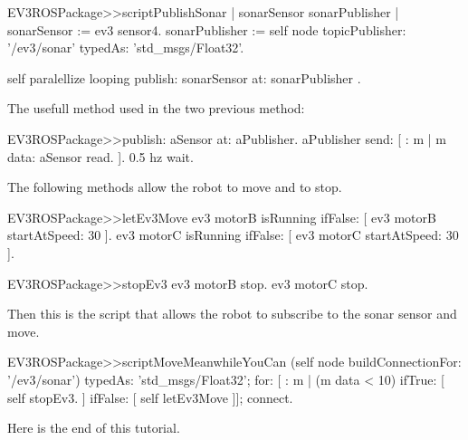 \documentclass[a4paper,10pt,twoside]{book}
\begin{document}
\begin{code}{}	
EV3ROSPackage>>scriptPublishSonar
	| sonarSensor sonarPublisher |
	sonarSensor := ev3 sensor4.
	sonarPublisher := self node topicPublisher: '/ev3/sonar' typedAs: 'std_msgs/Float32'.
	
	self paralellize looping publish: sonarSensor at: sonarPublisher .	
\end{code}

The usefull method used in the two previous method:

\begin{code}{}
EV3ROSPackage>>publish: aSensor at: aPublisher.
	aPublisher send: [ : m |
		m data: aSensor read.
	 ].
	0.5 hz wait.
\end{code}

The following methods allow the robot to move and to stop.

\begin{code}{}	
EV3ROSPackage>>letEv3Move
	ev3 motorB isRunning ifFalse: [ ev3 motorB startAtSpeed: 30 ].
	ev3 motorC isRunning ifFalse: [ ev3 motorC startAtSpeed: 30 ].
\end{code}

\begin{code}{}
EV3ROSPackage>>stopEv3
	ev3 motorB stop.
	ev3 motorC stop.
\end{code}


Then this is the script that allows the robot to subscribe to the sonar sensor and move.

\begin{code}{}
EV3ROSPackage>>scriptMoveMeanwhileYouCan
	(self node buildConnectionFor: '/ev3/sonar') 
			typedAs: 'std_msgs/Float32';
			for: [ : m |  (m data < 10) ifTrue: [  self stopEv3.  ]  ifFalse: [ self letEv3Move ]];
			connect.
\end{code}

Here is the end of this tutorial.



\ifx\wholebook\relax\else
\end{document}
